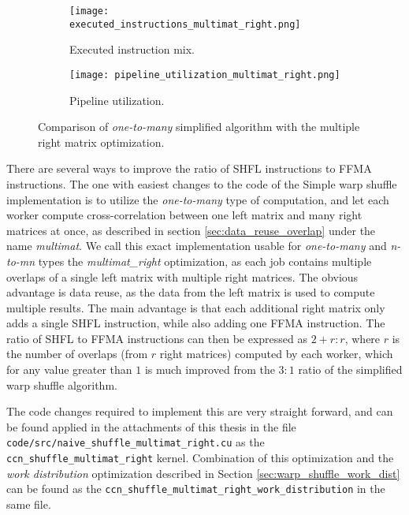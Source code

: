 \begin{figure}[ht]
	\centering	
	\begin{subfigure}{\textwidth}
		\centering
		\texttt{[image: executed\_instructions\_multimat\_right.png]}
		\caption{Executed instruction mix.}
		\label{fig:executed_instructions_multimat_right}
	\end{subfigure}
	\hfill
	\begin{subfigure}{\textwidth}
		\centering
		\texttt{[image: pipeline\_utilization\_multimat\_right.png]}
		\caption{Pipeline utilization.}
		\label{fig:pipeline_utilization_multimat_right}
	\end{subfigure}
	
	\caption{Comparison of \textit{one-to-many} simplified algorithm with the multiple right matrix optimization.}
	\label{fig:multimat_right_profiling}
\end{figure}

There are several ways to improve the ratio of SHFL instructions to FFMA instructions. The one with easiest changes to the code of the Simple warp shuffle implementation is to utilize the \textit{one-to-many} type of computation, and let each worker compute cross-correlation between one left matrix and many right matrices at once, as described in section \ref{sec:data_reuse_overlap} under the name \textit{multimat}. We call this exact implementation usable for \textit{one-to-many} and \textit{n-to-mn} types the \textit{multimat\_right} optimization, as each job contains multiple overlaps of a single left matrix with multiple right matrices. The obvious advantage is data reuse, as the data from the left matrix is used to compute multiple results. The main advantage is that each additional right matrix only adds a single SHFL instruction, while also adding one FFMA instruction. The ratio of SHFL to FFMA instructions can then be expressed as $2 + r : r$, where $r$ is the number of overlaps (from $r$ right matrices) computed by each worker, which for any value greater than $1$ is much improved from the $3:1$ ratio of the simplified warp shuffle algorithm.


The code changes required to implement this are very straight forward, and can be found applied in the attachments of this thesis in the file \texttt{code/src/naive\_shuffle\_multimat\_right.cu} as the \texttt{ccn\_shuffle\_multimat\_right} kernel. Combination of this optimization and the \textit{work distribution} optimization described in Section \ref{sec:warp_shuffle_work_dist} can be found as the \texttt{ccn\_shuffle\_multimat\_right\_work\_distribution} in the same file.

